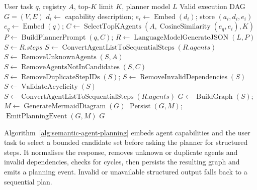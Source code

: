 \vspace{\baselineskip}
\begin{algorithm}[H]
\caption{Semantic Dependency-Aware Agent Planning}
\label{alg:semantic-agent-planning}
\begin{algorithmic}[1]
\Require User task $q$, registry $A$, top-$K$ limit $K$, planner model $L$
\Ensure Valid execution DAG $G=(V,E)$
        \State $d_i\gets$ capability description; $e_i\gets\operatorname{Embed}(d_i)$; store $(a_i,d_i,e_i)$
    \EndFor
\EndIf
\State $e_q\gets\operatorname{Embed}(q)$; $C\gets\operatorname{SelectTopKAgents}(A,\operatorname{CosineSimilarity}(e_q,e_i),K)$
\State $P\gets\operatorname{BuildPlannerPrompt}(q,C)$; $R\gets\operatorname{LanguageModelGenerateJSON}(L,P)$
    \State $S\gets R.steps$
\Else
    \State $S\gets\operatorname{ConvertAgentListToSequentialSteps}(R.agents)$
\EndIf
\State $S\gets\operatorname{RemoveUnknownAgents}(S,A)$
\State $S\gets\operatorname{RemoveAgentsNotInCandidates}(S,C)$
\State $S\gets\operatorname{RemoveDuplicateStepIDs}(S)$; $S\gets\operatorname{RemoveInvalidDependencies}(S)$
\State $S\gets\operatorname{ValidateAcyclicity}(S)$
    \State $S\gets\operatorname{ConvertAgentListToSequentialSteps}(R.agents)$
\EndIf
\State $G\gets\operatorname{BuildGraph}(S)$; $M\gets\operatorname{GenerateMermaidDiagram}(G)$
\State $\operatorname{Persist}(G,M)$; $\operatorname{EmitPlanningEvent}(G,M)$
\State \Return $G$
\end{algorithmic}
\end{algorithm}
Algorithm~\ref{alg:semantic-agent-planning} embeds agent capabilities and the user task to select a bounded candidate set before asking the planner for structured steps. It normalises the response, removes unknown or duplicate agents and invalid dependencies, checks for cycles, then persists the resulting graph and emits a planning event. Invalid or unavailable structured output falls back to a sequential plan.

